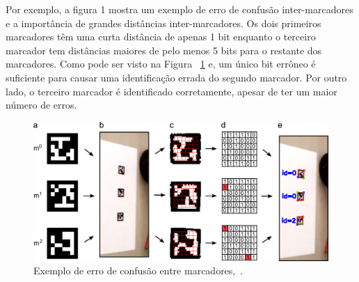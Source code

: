 Por exemplo, a figura 1 mostra um exemplo de erro de confusão inter-marcadores e a importância de grandes distâncias inter-marcadores. Os dois primeiros marcadores têm uma curta distância de apenas 1 bit enquanto o terceiro marcador tem distâncias maiores de pelo menos 5  bits para o restante dos marcadores. Como pode ser visto na Figura ~\ref{fig:aruco-definicao} e, um único bit errôneo é suficiente para causar uma identificação errada do segundo marcador. Por outro lado, o terceiro marcador é identificado corretamente, apesar de ter um maior número de erros.

\begin{figure}[h]
	\centering
	\includegraphics[width=14cm, height=6 cm]{figuras/arucofig1.jpg}
	\caption{Exemplo de erro de confusão entre marcadores,~\cite{Ramirez2018}.}
	\label{fig:aruco-definicao}
\end{figure}